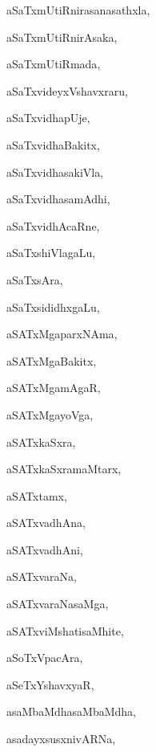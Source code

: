 \begin{multicols}{3}
{\noindent
{aSaTxmUtiRnirasanasathxla}, \pageref{aSaTxmUtiRnirasanasathxla}

\noindent
{aSaTxmUtiRnirAsaka}, \pageref{aSaTxmUtiRnirAsaka}

\noindent
{aSaTxmUtiRmada}, \pageref{aSaTxmUtiRmada}

\noindent
{aSaTxvideyxVshavxraru}, \pageref{aSaTxvideyxVshavxraru}

\noindent
{aSaTxvidhapUje}, \pageref{aSaTxvidhapUje}

\noindent
{aSaTxvidhaBakitx}, \pageref{aSaTxvidhaBakitx}

\noindent
{aSaTxvidhasakiVla}, \pageref{aSaTxvidhasakiVla}

\noindent
{aSaTxvidhasamAdhi}, \pageref{aSaTxvidhasamAdhi}

\noindent
{aSaTxvidhAcaRne}, \pageref{aSaTxvidhAcaRne}

\noindent
{aSaTxshiVlagaLu}, \pageref{aSaTxshiVlagaLu}

\noindent
{aSaTxsAra}, \pageref{aSaTxsAra}

\noindent
{aSaTxsididhxgaLu}, \pageref{aSaTxsididhxgaLu}

\noindent
{aSATxMgaparxNAma}, \pageref{aSATxMgaparxNAma}

\noindent
{aSATxMgaBakitx}, \pageref{aSATxMgaBakitx}

\noindent
{aSATxMgamAgaR}, \pageref{aSATxMgamAgaR}

\noindent
{aSATxMgayoVga}, \pageref{aSATxMgayoVga}

\noindent
{aSATxkaSxra}, \pageref{aSATxkaSxra}

\noindent
{aSATxkaSxramaMtarx}, \pageref{aSATxkaSxramaMtarx}

\noindent
{aSATxtamx}, \pageref{aSATxtamx}

\noindent
{aSATxvadhAna}, \pageref{aSATxvadhAna}

\noindent
{aSATxvadhAni}, \pageref{aSATxvadhAni}

\noindent
{aSATxvaraNa}, \pageref{aSATxvaraNa}

\noindent
{aSATxvaraNasaMga}, \pageref{aSATxvaraNasaMga}

\noindent
{aSATxviMshatisaMhite}, \pageref{aSATxviMshatisaMhite}

\noindent
{aSoTxVpacAra}, \pageref{aSoTxVpacAra}

\noindent
{aSeTxYshavxyaR}, \pageref{aSeTxYshavxyaR}

\noindent
{asaMbaMdhasaMbaMdha}, \pageref{asaMbaMdhasaMbaMdha}

\noindent
{asadayxsusxnivARNa}, \pageref{asadayxsusxnivARNa}

}
\end{multicols}
